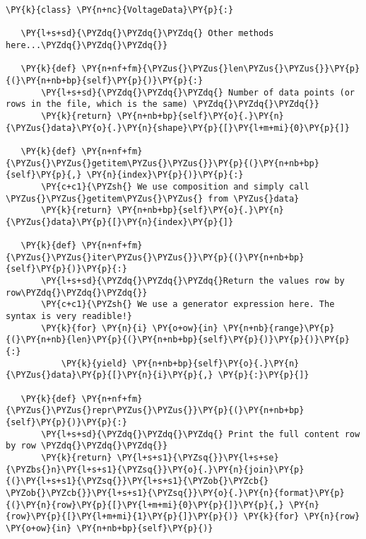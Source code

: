 \begin{Verbatim}[label=\makebox{\url{https://github.com/lucabaldini/cmepda/tree/master/slides/latex/snippets/voltage\_data\_2.py}},commandchars=\\\{\}]
\PY{k}{class} \PY{n+nc}{VoltageData}\PY{p}{:}

   \PY{l+s+sd}{\PYZdq{}\PYZdq{}\PYZdq{} Other methods here...\PYZdq{}\PYZdq{}\PYZdq{}}
   
   \PY{k}{def} \PY{n+nf+fm}{\PYZus{}\PYZus{}len\PYZus{}\PYZus{}}\PY{p}{(}\PY{n+nb+bp}{self}\PY{p}{)}\PY{p}{:}
       \PY{l+s+sd}{\PYZdq{}\PYZdq{}\PYZdq{} Number of data points (or rows in the file, which is the same) \PYZdq{}\PYZdq{}\PYZdq{}}
       \PY{k}{return} \PY{n+nb+bp}{self}\PY{o}{.}\PY{n}{\PYZus{}data}\PY{o}{.}\PY{n}{shape}\PY{p}{[}\PY{l+m+mi}{0}\PY{p}{]}
   
   \PY{k}{def} \PY{n+nf+fm}{\PYZus{}\PYZus{}getitem\PYZus{}\PYZus{}}\PY{p}{(}\PY{n+nb+bp}{self}\PY{p}{,} \PY{n}{index}\PY{p}{)}\PY{p}{:}
       \PY{c+c1}{\PYZsh{} We use composition and simply call \PYZus{}\PYZus{}getitem\PYZus{}\PYZus{} from \PYZus{}data}
       \PY{k}{return} \PY{n+nb+bp}{self}\PY{o}{.}\PY{n}{\PYZus{}data}\PY{p}{[}\PY{n}{index}\PY{p}{]}
   
   \PY{k}{def} \PY{n+nf+fm}{\PYZus{}\PYZus{}iter\PYZus{}\PYZus{}}\PY{p}{(}\PY{n+nb+bp}{self}\PY{p}{)}\PY{p}{:}
       \PY{l+s+sd}{\PYZdq{}\PYZdq{}\PYZdq{}Return the values row by row\PYZdq{}\PYZdq{}\PYZdq{}}
       \PY{c+c1}{\PYZsh{} We use a generator expression here. The syntax is very readible!}
       \PY{k}{for} \PY{n}{i} \PY{o+ow}{in} \PY{n+nb}{range}\PY{p}{(}\PY{n+nb}{len}\PY{p}{(}\PY{n+nb+bp}{self}\PY{p}{)}\PY{p}{)}\PY{p}{:}
           \PY{k}{yield} \PY{n+nb+bp}{self}\PY{o}{.}\PY{n}{\PYZus{}data}\PY{p}{[}\PY{n}{i}\PY{p}{,} \PY{p}{:}\PY{p}{]} 
           
   \PY{k}{def} \PY{n+nf+fm}{\PYZus{}\PYZus{}repr\PYZus{}\PYZus{}}\PY{p}{(}\PY{n+nb+bp}{self}\PY{p}{)}\PY{p}{:}
       \PY{l+s+sd}{\PYZdq{}\PYZdq{}\PYZdq{} Print the full content row by row \PYZdq{}\PYZdq{}\PYZdq{}}
       \PY{k}{return} \PY{l+s+s1}{\PYZsq{}}\PY{l+s+se}{\PYZbs{}n}\PY{l+s+s1}{\PYZsq{}}\PY{o}{.}\PY{n}{join}\PY{p}{(}\PY{l+s+s1}{\PYZsq{}}\PY{l+s+s1}{\PYZob{}\PYZcb{} \PYZob{}\PYZcb{}}\PY{l+s+s1}{\PYZsq{}}\PY{o}{.}\PY{n}{format}\PY{p}{(}\PY{n}{row}\PY{p}{[}\PY{l+m+mi}{0}\PY{p}{]}\PY{p}{,} \PY{n}{row}\PY{p}{[}\PY{l+m+mi}{1}\PY{p}{]}\PY{p}{)} \PY{k}{for} \PY{n}{row} \PY{o+ow}{in} \PY{n+nb+bp}{self}\PY{p}{)}
   

\end{Verbatim}

